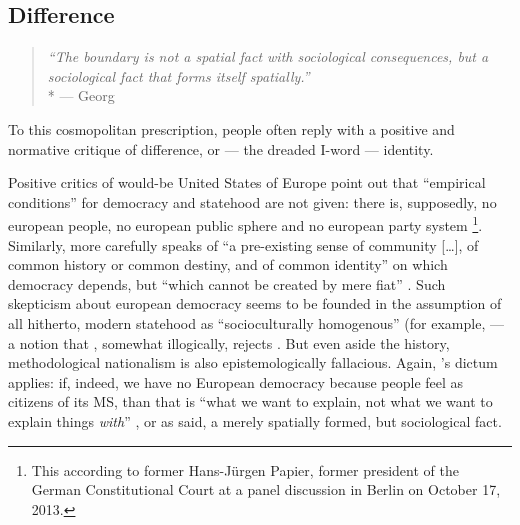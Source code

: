 \subsection[Difference]{Difference} \label{sec:ID-Difference}

\begin{quote}
	\emph{``The boundary is not a spatial fact with sociological consequences, but a sociological fact that forms itself spatially.''}
	\\*
	--- Georg \citet[142]{Simmel1903}
\end{quote}

To this cosmopolitan prescription, people often reply with a positive and normative critique of difference, or --- the dreaded I-word --- identity.

Positive critics of would-be United States of Europe point out that ``empirical conditions'' for democracy and statehood are not given:
there is, supposedly, no european people, no european public sphere and no european party system
\footnote{
	This according to former Hans-Jürgen Papier, former president of the German Constitutional Court at a panel discussion in Berlin on October 17, 2013.
}.
Similarly, \citeauthor{Scharpf1997} more carefully 	speaks of ``a pre-existing sense of community [\ldots], of common history or common destiny, and of common identity'' on which democracy depends, but ``which cannot be created by mere fiat'' \citeyearpar[20]{Scharpf1997}.
Such skepticism about european democracy seems to be founded in the assumption of all hitherto, modern statehood as ``socioculturally homogenous'' (for example, \citealt[93]{BeckGrande-2007-aa} --- a notion that \citeauthor{Scharpf1997}, somewhat illogically, rejects \citeyearpar[20]{Scharpf1997}.
But even aside the history, methodological nationalism is also epistemologically fallacious.
Again, \citeauthor{Brubaker-2002-aa}'s dictum applies:
if, indeed, we have no European democracy because people feel as citizens of its \gls{MS}, than that is ``what we want to explain, not what we want to explain things \emph{with}'' \citeyearpar[165, emphasis in original]{Brubaker-2002-aa}, or as \citeauthor{Simmel1903} said, a merely spatially formed, but sociological fact.

